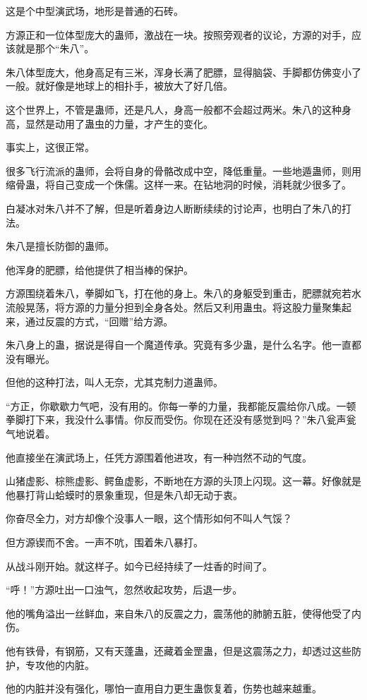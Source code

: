 \begin{this_body}
这是个中型演武场，地形是普通的石砖。

方源正和一位体型庞大的蛊师，激战在一块。按照旁观者的议论，方源的对手，应该就是那个“朱八”。

朱八体型庞大，他身高足有三米，浑身长满了肥膘，显得脑袋、手脚都仿佛变小了一般。就好像是地球上的相扑手，被放大了好几倍。

这个世界上，不管是蛊师，还是凡人，身高一般都不会超过两米。朱八的这种身高，显然是动用了蛊虫的力量，才产生的变化。

事实上，这很正常。

很多飞行流派的蛊师，会将自身的骨骼改成中空，降低重量。一些地遁蛊师，则用缩骨蛊，将自己变成一个侏儒。这样一来。在钻地洞的时候，消耗就少很多了。

白凝冰对朱八并不了解，但是听着身边人断断续续的讨论声，也明白了朱八的打法。

朱八是擅长防御的蛊师。

他浑身的肥膘，给他提供了相当棒的保护。

方源围绕着朱八，拳脚如飞，打在他的身上。朱八的身躯受到重击，肥膘就宛若水流般晃荡，将方源的力量分担到全身各处。然后又利用蛊虫。将这股力量聚集起来，通过反震的方式，“回赠”给方源。

朱八身上的蛊，据说是得自一个魔道传承。究竟有多少蛊，是什么名字。他一直都没有曝光。

但他的这种打法，叫人无奈，尤其克制力道蛊师。

“方正，你歇歇力气吧，没有用的。你每一拳的力量，我都能反震给你八成。一顿拳脚打下来，我没什么事情。你反而受伤。你现在还没有感觉到吗？”朱八瓮声瓮气地说着。

他直接坐在演武场上，任凭方源围着他进攻，有一种岿然不动的气度。

山猪虚影、棕熊虚影、鳄鱼虚影，不断地在方源的头顶上闪现。这一幕。好像就是他暴打背山蛤蟆时的景象重现，但是朱八却无动于衷。

你奋尽全力，对方却像个没事人一眼，这个情形如何不叫人气馁？

但方源锲而不舍。一声不吭，围着朱八暴打。

从战斗刚开始。就这样子。如今已经持续了一炷香的时间了。

“呼！”方源吐出一口浊气，忽然收起攻势，后退一步。

他的嘴角溢出一丝鲜血，来自朱八的反震之力，震荡他的肺腑五脏，使得他受了内伤。

他有铁骨，有钢筋，又有天蓬蛊，还藏着金罡蛊，但是这震荡之力，却透过这些防护，专攻他的内脏。

他的内脏并没有强化，哪怕一直用自力更生蛊恢复着，伤势也越来越重。


\end{this_body}
